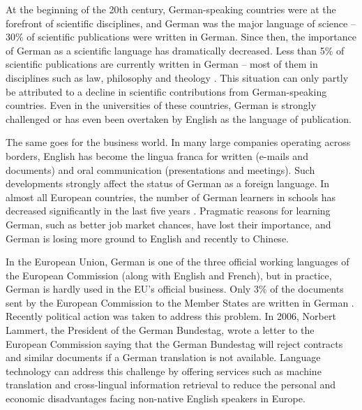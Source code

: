 \begin{multicols}{2}
At the beginning of the 20th century, German-speaking countries were at the forefront of scientific disciplines, and German was the major language of science -- 30\% of scientific publications were written in German. Since then, the importance of German as a scientific language has dramatically decreased. Less than 5\% of scientific publications are currently written in German -- most of them in disciplines such as law, philosophy and theology \cite{joy1}. This situation can only partly be attributed to a decline in scientific contributions from German-speaking countries. Even in the universities of these countries, German is strongly challenged or has even been overtaken by English as the language of publication.


The same goes for the business world. In many large companies operating across borders, English has become the lingua franca for written (e-mails and documents) and oral communication (presentations and meetings). Such developments strongly affect the status of German as a foreign language. 
In almost all European countries, the number of German learners in schools has decreased significantly in the last five years \cite{spiegel2012}. Pragmatic reasons for learning German, such as better job market chances, have lost their importance, and German is losing more ground to English and recently to Chinese. 


In the European Union, German is one of the three official working languages of the European Commission (along with English and French), but in practice, German is hardly used in the EU’s official business. Only 3\% of the documents sent by the European Commission to the Member States are written in German  \cite{joy1}. Recently political action was taken to address this problem. In 2006, Norbert Lammert, the President of the German Bundestag, wrote a letter to the European Commission saying that the German Bundestag will reject contracts and similar documents if a German translation is not available. Language technology can address this challenge by offering services such as machine translation and cross-lingual information retrieval to reduce the personal and economic disadvantages facing non-native English speakers in Europe.


\end{multicols}

